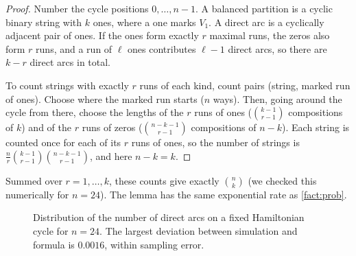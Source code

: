 \documentclass[11pt,a4paper]{article}
\theoremstyle{plain}
\newtheorem{lemma}[theorem]{Lemma}
\theoremstyle{remark}
\begin{document}
\begin{proof}
Number the cycle positions $0,\dots,n-1$. A balanced partition is a cyclic binary string with $k$ ones, where a one marks $V_1$. A direct arc is a cyclically adjacent pair of ones. If the ones form exactly $r$ maximal runs, the zeros also form $r$ runs, and a run of $\ell$ ones contributes $\ell - 1$ direct arcs, so there are $k - r$ direct arcs in total.

To count strings with exactly $r$ runs of each kind, count pairs (string, marked run of ones). Choose where the marked run starts ($n$ ways). Then, going around the cycle from there, choose the lengths of the $r$ runs of ones ($\binom{k-1}{r-1}$ compositions of $k$) and of the $r$ runs of zeros ($\binom{n-k-1}{r-1}$ compositions of $n-k$). Each string is counted once for each of its $r$ runs of ones, so the number of strings is $\frac{n}{r}\binom{k-1}{r-1}\binom{n-k-1}{r-1}$, and here $n - k = k$.
\end{proof}

\noindent
Summed over $r = 1,\dots,k$, these counts give exactly $\binom{n}{k}$ (we checked this numerically for $n = 24$). The lemma has the same exponential rate as \cref{fact:prob}.

\begin{figure}[h]
\centering
{}
\caption{Distribution of the number of direct arcs on a fixed Hamiltonian cycle for $n = 24$. The largest deviation between simulation and formula is $0.0016$, within sampling error.}
\label{fig:mc}
\end{figure}
\end{document}

